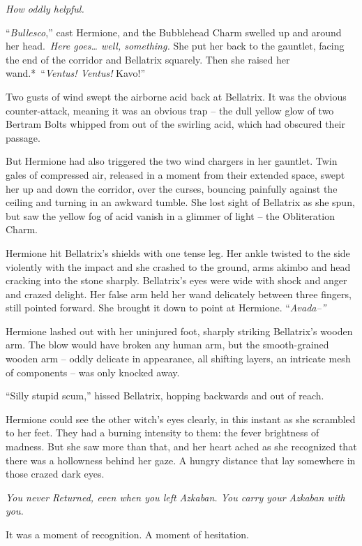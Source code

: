 \emph{How oddly helpful.}

``\emph{Bullesco},'' cast Hermione, and the Bubblehead Charm swelled up
and around her head.~\emph{Here goes\ldots{} well, something.} She put
her back to the gauntlet, facing the end of the corridor and Bellatrix
squarely. Then she raised her wand.*~``\emph{Ventus! Ventus!} Kavo!''

Two gusts of wind swept the airborne acid back at Bellatrix. It was the
obvious counter-attack, meaning it was an obvious trap -- the dull
yellow glow of two Bertram Bolts whipped from out of the swirling acid,
which had obscured their passage.

But Hermione had also triggered the two wind chargers in her gauntlet.
Twin gales of compressed air, released in a moment from their extended
space, swept her up and down the corridor, over the curses, bouncing
painfully against the ceiling and turning in an awkward tumble. She lost
sight of Bellatrix as she spun, but saw the yellow fog of acid vanish in
a glimmer of light -- the Obliteration Charm.

Hermione hit Bellatrix's shields with one tense leg. Her ankle twisted
to the side violently with the impact and she crashed to the ground,
arms akimbo and head cracking into the stone sharply. Bellatrix's eyes
were wide with shock and anger and crazed delight. Her false arm held
her wand delicately between three fingers, still pointed forward. She
brought it down to point at Hermione. ``\emph{Avada--''}

Hermione lashed out with her uninjured foot, sharply striking
Bellatrix's wooden arm. The blow would have broken any human arm, but
the smooth-grained wooden arm -- oddly delicate in appearance, all
shifting layers, an intricate mesh of components -- was only knocked
away.

``Silly stupid scum,'' hissed Bellatrix, hopping backwards and out of
reach.

Hermione could see the other witch's eyes clearly, in this instant as
she scrambled to her feet. They had a burning intensity to them: the
fever brightness of madness. But she saw more than that, and her heart
ached as she recognized that there was a hollowness behind her gaze. A
hungry distance that lay somewhere in those crazed dark eyes.

\emph{You never Returned, even when you left Azkaban. You carry your
Azkaban with you.}

It was a moment of recognition. A moment of hesitation.

